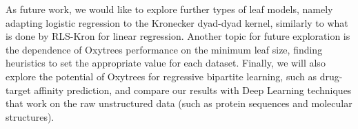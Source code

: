 \documentclass[sn-mathphys-num]{sn-jnl}%
\theoremstyle{thmstyleone}%
\theoremstyle{thmstyletwo}%
\theoremstyle{thmstylethree}%
\begin{document}
As future work, we would like to explore further types of leaf models, namely adapting logistic regression to the Kronecker dyad-dyad kernel, similarly to what is done by RLS-Kron for linear regression.
Another topic for future exploration is the dependence of Oxytrees performance on the minimum leaf size, finding heuristics to set the appropriate value for each dataset.
Finally, we will also explore the potential of Oxytrees for regressive bipartite learning, such as drug-target affinity prediction, and compare our results with Deep Learning techniques that work on the raw unstructured data (such as protein sequences and molecular structures).
%


 




\end{document}
